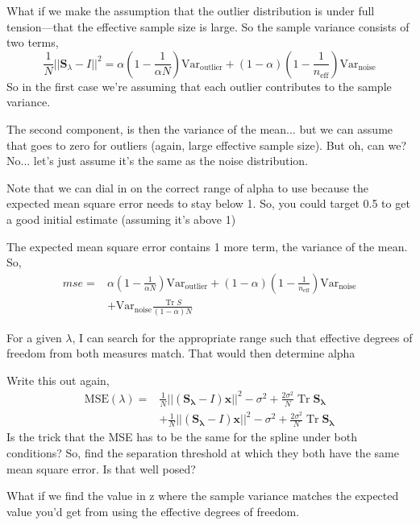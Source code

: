 \documentclass[10pt,journal]{IEEEtran}
\DeclareMathOperator{\Tr}{Tr}
\begin{document}
What if we make the assumption that the outlier distribution is under full tension---that the effective sample size is large. So the sample variance consists of two terms,
\begin{equation}
    \frac{1}{N}||\mathbf{S}_\lambda - I||^2 = \alpha \left(1-\frac{1}{\alpha N}\right) \textrm{Var}_\textrm{outlier} + (1-\alpha) \left(1-\frac{1}{n_\textrm{eff}}\right) \textrm{Var}_\textrm{noise}
\end{equation}
So in the first case we're assuming that each outlier contributes to the sample variance.

The second component, is then the variance of the mean... but we can assume that goes to zero for outliers (again, large effective sample size). But oh, can we? No... let's just assume it's the same as the noise distribution.

Note that we can dial in on the correct range of alpha to use because the expected mean square error needs to stay below 1. So, you could target 0.5 to get a good initial estimate (assuming it's above 1)

The expected mean square error contains 1 more term, the variance of the mean. So,
\begin{align}
    mse =& \alpha \left(1-\frac{1}{\alpha N}\right) \textrm{Var}_\textrm{outlier} + (1-\alpha) \left(1-\frac{1}{n_\textrm{eff}}\right) \textrm{Var}_\textrm{noise} \\&+ \textrm{Var}_\textrm{noise} \frac{\Tr S}{(1-\alpha)N}
\end{align}

For a given $\lambda$, I can search for the appropriate range such that effective degrees of freedom from both measures match. That would then determine alpha

Write this out again,
\begin{align}
\label{MSE}
    \textrm{MSE}(\lambda) =& \frac{1}{N} || \left( \mathbf{S_\lambda} - I \right) \mathbf{x} ||^2 - \sigma^2 + \frac{2 \sigma^2}{N}  \Tr \mathbf{S_\lambda} \\
    &+\frac{1}{N} || \left( \mathbf{S_\lambda} - I \right) \mathbf{x} ||^2 - \sigma^2 + \frac{2 \sigma^2}{N}  \Tr \mathbf{S_\lambda}
\end{align}
Is the trick that the MSE has to be the same for the spline under both conditions? So, find the separation threshold at which they both have the same mean square error. Is that well posed?

What if we find the value in z where the sample variance matches the expected value you'd get from using the effective degrees of freedom.
\end{document}
